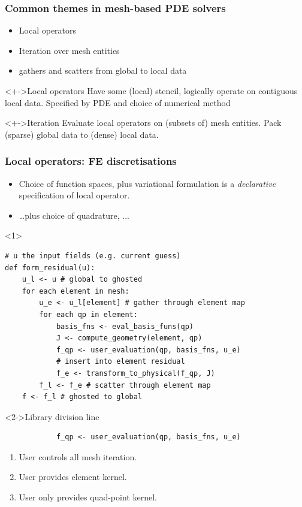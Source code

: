 \documentclass[presentation]{beamer}
\begin{document}
\begin{frame}
  \frametitle{Common themes in mesh-based PDE solvers}
  \begin{itemize}
  \item Local operators
  \item Iteration over mesh entities
  \item gathers and scatters from global to local data
  \end{itemize}

  \begin{block}<+->{Local operators}
    Have some (local) stencil, logically operate on contiguous local
    data.  Specified by PDE and choice of numerical method
  \end{block}
  \begin{block}<+->{Iteration} Evaluate local operators on (subsets
    of) mesh entities.  Pack (sparse) global data to (dense) local
    data.
  \end{block}
\end{frame}

\begin{frame}[fragile]
  \frametitle{Local operators: FE discretisations}
  \begin{itemize}
  \item Choice of function spaces, plus variational formulation is a
    \emph{declarative} specification of local operator.
  \item \ldots{}plus choice of quadrature, ...
  \end{itemize}
  \begin{onlyenv}<1>
\begin{verbatim}
# u the input fields (e.g. current guess)
def form_residual(u):
    u_l <- u # global to ghosted
    for each element in mesh:
        u_e <- u_l[element] # gather through element map
        for each qp in element:
            basis_fns <- eval_basis_funs(qp)
            J <- compute_geometry(element, qp)
            f_qp <- user_evaluation(qp, basis_fns, u_e)
            # insert into element residual
            f_e <- transform_to_physical(f_qp, J)
        f_l <- f_e # scatter through element map
    f <- f_l # ghosted to global
\end{verbatim}
  \end{onlyenv}
  \begin{block}<2->{Library division line}
\begin{verbatim}
            f_qp <- user_evaluation(qp, basis_fns, u_e)
\end{verbatim}    
    \begin{enumerate}
    \item User controls all mesh iteration.
    \item User provides element kernel.
    \item User only provides quad-point kernel.
    \end{enumerate}
  \end{block}
\end{frame}
\end{document}
